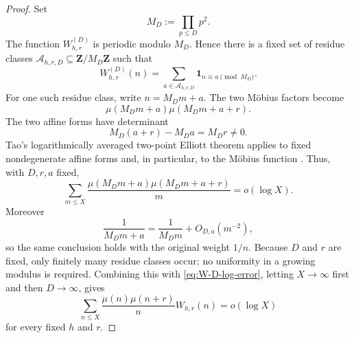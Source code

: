 \documentclass[11pt]{amsart}
\numberwithin{equation}{section}
\theoremstyle{plain}
\theoremstyle{definition}
\theoremstyle{remark}
\begin{document}
\begin{proof}
Set
\begin{equation}
\label{eq:MD-definition}
M_D:=\prod_{p\le D}p^2.
\end{equation}
The function $W_{h,r}^{(D)}$ is periodic modulo $M_D$.  Hence there is a
fixed set of residue classes $\mathcal A_{h,r,D}\subseteq\mathbf Z/M_D\mathbf Z$
such that
\begin{equation}
\label{eq:WD-residue-expansion}
W_{h,r}^{(D)}(n)=
\sum_{a\in\mathcal A_{h,r,D}}
\mathbf 1_{n\equiv a\pmod{M_D}}.
\end{equation}
For one such residue class, write $n=M_Dm+a$.  The two M\"obius factors become
\begin{equation}
\label{eq:two-affine-forms}
\mu(M_Dm+a)\mu(M_Dm+a+r).
\end{equation}
The two affine forms have determinant
\begin{equation}
\label{eq:affine-form-determinant}
M_D(a+r)-M_Da=M_Dr\ne0.
\end{equation}
Tao's logarithmically averaged two-point Elliott theorem applies to fixed
nondegenerate affine forms and, in particular, to the M\"obius function
\cite{Tao2016}.  Thus, with $D,r,a$ fixed,
\begin{equation}
\label{eq:Tao-fixed-class}
\sum_{m\le X}
\frac{\mu(M_Dm+a)\mu(M_Dm+a+r)}{m}
=o(\log X).
\end{equation}
Moreover
\begin{equation}
\label{eq:weight-affine-adjustment}
\frac1{M_Dm+a}=\frac1{M_Dm}+O_{D,a}(m^{-2}),
\end{equation}
so the same conclusion holds with the original weight $1/n$.  Because
$D$ and $r$ are fixed, only finitely many residue classes occur; no uniformity
in a growing modulus is required.  Combining this with
\eqref{eq:W-D-log-error}, letting $X\to\infty$ first and then $D\to\infty$,
gives
\begin{equation}
\label{eq:fixed-r-vanishing}
\sum_{n\le X}
\frac{\mu(n)\mu(n+r)}{n}W_{h,r}(n)=o(\log X)
\end{equation}
for every fixed $h$ and $r$.


\end{proof}
\end{document}
